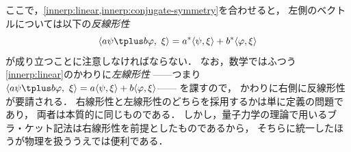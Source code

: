 \documentclass[
]{sotsu}
\begin{document}
ここで，\cref{innerp:linear,innerp:conjugate-symmetry}を合わせると，
左側のベクトルについては以下の\emph{反線形性}
\begin{equation*}
    \iparen{a \psi \vecplus b \varphi, \  \xi}
        = \conj{a} \iparen{\psi, \xi} + \conj{b} \iparen{\varphi, \xi}
\end{equation*}
が成り立つことに注意しなければならない．
なお，数学ではふつう\cref{innerp:linear}のかわりに\emph{左線形性}%
------つまり\(
    \iparen{a \psi \vecplus b \varphi, \  \xi}
    = a \iparen{\psi, \xi} + b \iparen{\varphi, \xi}
\)------%
を課すので，
かわりに右側に反線形性が要請される．
右線形性と左線形性のどちらを採用するかは単に定義の問題であり，
両者は本質的に同じものである．
しかし，量子力学の理論で用いるブラ・ケット記法は右線形性を前提としたものであるから，
そちらに統一したほうが物理を扱ううえでは便利である．
\end{document}
